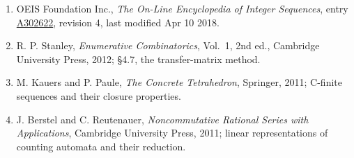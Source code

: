\documentclass[11pt]{article}
\theoremstyle{definition}
\begin{document}
\begin{enumerate}

\item OEIS Foundation Inc., \emph{The On-Line Encyclopedia of Integer Sequences}, entry \href{https://oeis.org/A302622}{A302622}, revision 4, last modified Apr 10 2018.

\item R. P. Stanley, \emph{Enumerative Combinatorics}, Vol.~1, 2nd ed., Cambridge University Press, 2012; \S4.7, the transfer-matrix method.

\item M. Kauers and P. Paule, \emph{The Concrete Tetrahedron}, Springer, 2011; C-finite sequences and their closure properties.

\item J. Berstel and C. Reutenauer, \emph{Noncommutative Rational Series with Applications}, Cambridge University Press, 2011; linear representations of counting automata and their reduction.

\end{enumerate}
\end{document}
